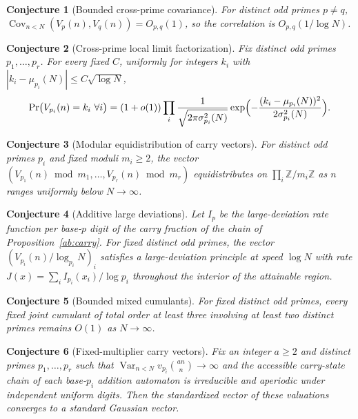 \documentclass[11pt]{article}
\newtheorem{conjecture}{Conjecture}
\theoremstyle{definition}
\newcommand{\Z}{\mathbb Z}
\providecommand{\Z}{\mathbb Z}
\begin{document}
\begin{conjecture}[Bounded cross-prime covariance]\label{ab13}
For distinct odd primes $p\ne q$, $\operatorname{Cov}_{n<N}(V_p(n),V_q(n))=O_{p,q}(1)$, so the correlation is $O_{p,q}(1/\log N)$.
\end{conjecture}

\begin{conjecture}[Cross-prime local limit factorization]\label{ab14}
Fix distinct odd primes $p_1,\ldots,p_r$.  For every fixed $C$, uniformly for integers $k_i$ with $|k_i-\mu_{p_i}(N)|\le C\sqrt{\log N}$,
\[
\Pr\bigl(V_{p_i}(n)=k_i\ \forall i\bigr)=(1+o(1))\prod_i\frac{1}{\sqrt{2\pi\sigma^2_{p_i}(N)}}\exp\Bigl(-\frac{(k_i-\mu_{p_i}(N))^2}{2\sigma^2_{p_i}(N)}\Bigr).
\]
\end{conjecture}

\begin{conjecture}[Modular equidistribution of carry vectors]\label{ab15}
For distinct odd primes $p_i$ and fixed moduli $m_i\ge2$, the vector $(V_{p_1}(n)\bmod m_1,\ldots,V_{p_r}(n)\bmod m_r)$ equidistributes on $\prod_i\Z/m_i\Z$ as $n$ ranges uniformly below $N\to\infty$.
\end{conjecture}

\begin{conjecture}[Additive large deviations]\label{ab16}
Let $I_p$ be the large-deviation rate function per base-$p$ digit of the carry fraction of the chain of Proposition~\ref{ab:carry}.  For fixed distinct odd primes, the vector $(V_{p_i}(n)/\log_{p_i}N)_i$ satisfies a large-deviation principle at speed $\log N$ with rate $J(x)=\sum_iI_{p_i}(x_i)/\log p_i$ throughout the interior of the attainable region.
\end{conjecture}

\begin{conjecture}[Bounded mixed cumulants]\label{ab17}
For fixed distinct odd primes, every fixed joint cumulant of total order at least three involving at least two distinct primes remains $O(1)$ as $N\to\infty$.
\end{conjecture}

\begin{conjecture}[Fixed-multiplier carry vectors]\label{ab18}
Fix an integer $a\ge2$ and distinct primes $p_1,\ldots,p_r$ such that $\operatorname{Var}_{n<N}v_{p_i}\binom{an}{n}\to\infty$ and the accessible carry-state chain of each base-$p_i$ addition automaton is irreducible and aperiodic under independent uniform digits.  Then the standardized vector of these valuations converges to a standard Gaussian vector.
\end{conjecture}
\end{document}
